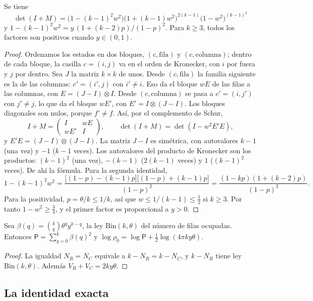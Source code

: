 \begin{lema}[Un lazo]\label{lem:torres-lazo}
Se tiene
\[
 \det(I+M)=\bigl(1-(k-1)^2w^2\bigr)\bigl(1+(k-1)w^2\bigr)^{2(k-1)}\bigl(1-w^2\bigr)^{(k-1)^2}
\]
y $1-(k-1)^2w^2=y\,(1+(k-2)p)/(1-p)^2$. Para $k\ge3$, todos los factores son positivos cuando
$y\in(0,1)$.
\end{lema}
\begin{proof}
Ordenamos los estados en dos bloques, $(c,\text{fila})$ y $(c,\text{columna})$; dentro de cada bloque,
la casilla $c=(i,j)$ va en el orden de Kronecker, con $i$ por fuera y $j$ por dentro. Sea $J$ la matriz
$k\times k$ de unos. Desde $(c,\text{fila})$ la familia siguiente es la de las columnas: $c'=(i',j)$ con
$i'\ne i$. Eso da el bloque $wE$ de las filas a las columnas, con $E=(J-I)\otimes I$. Desde
$(c,\text{columna})$ se pasa a $c'=(i,j')$ con $j'\ne j$, lo que da el bloque $wE'$, con
$E'=I\otimes(J-I)$. Los bloques diagonales son nulos, porque $f'\ne f$. Así, por el complemento de Schur,
\[
 I+M=\begin{pmatrix}I&wE\\ wE'&I\end{pmatrix},\qquad \det(I+M)=\det(I-w^2E'E),
\]
y $E'E=(J-I)\otimes(J-I)$. La matriz $J-I$ es simétrica, con autovalores $k-1$ (una vez) y $-1$ ($k-1$
veces). Los autovalores del producto de Kronecker son los productos: $(k-1)^2$ (una vez), $-(k-1)$
($2(k-1)$ veces) y $1$ ($(k-1)^2$ veces). De ahí la fórmula. Para la segunda identidad,
\[
 1-(k-1)^2w^2=\frac{\bigl[(1-p)-(k-1)p\bigr]\bigl[(1-p)+(k-1)p\bigr]}{(1-p)^2}
 =\frac{(1-kp)(1+(k-2)p)}{(1-p)^2}.
\]
Para la positividad, $p=\theta/k\le1/k$, así que $w\le1/(k-1)\le\frac12$ si $k\ge3$. Por tanto
$1-w^2\ge\frac34$, y el primer factor es proporcional a $y>0$.
\end{proof}

\begin{lema}\label{lem:torres-cero}
Sea $\beta(q)=\binom kq\theta^qy^{k-q}$, la ley $\mathrm{Bin}(k,\theta)$ del número de filas ocupadas.
Entonces $\mathsf P=\sum_{q=0}^k\beta(q)^2$ y $\log\rho_0=\log\mathsf P+\frac12\log(4\pi ky\theta)$.
\end{lema}
\begin{proof}
La igualdad $N_R=N_C$ equivale a $k-N_R=k-N_C$, y $k-N_R$ tiene ley $\mathrm{Bin}(k,\theta)$. Además
$V_R+V_C=2ky\theta$.
\end{proof}

\subsection{La identidad exacta}

